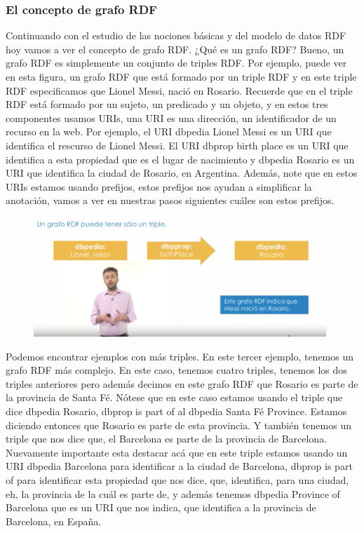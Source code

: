 \subsubsection{El concepto de grafo RDF}

Continuando con el estudio de las nociones básicas y del modelo de datos RDF hoy vamos a ver el concepto de grafo RDF. ¿Qué es un grafo RDF? Bueno, un grafo RDF es simplemente un conjunto de triples RDF. Por ejemplo, puede ver en esta figura, un grafo RDF que está formado por un triple RDF y en este triple RDF especificamos que Lionel Messi, nació en Rosario. Recuerde que en el triple RDF está formado por un sujeto, un predicado y un objeto, y en estos tres componentes usamos URIs, una URI es una dirección, un identificador de un recurso en la web. Por ejemplo, el URI dbpedia Lionel Messi es un URI que identifica el rescurso de Lionel Messi. El URI dbprop birth place es un URI que identifica a esta propiedad que es el lugar de nacimiento y dbpedia Rosario es un URI que identifica la ciudad de Rosario, en Argentina. Además, note que en estos URIs estamos usando prefijos, estos prefijos nos ayudan a simplificar la anotación, vamos a ver en nuestras pasos siguientes cuáles son estos prefijos. 

\begin{figure}[H]
	\centering
	\includegraphics[height=4.5cm]{imagenes/capitulo3/16} 
	\caption{}
	\label{}
\end{figure}

Podemos encontrar ejemplos con más triples. En este tercer ejemplo, tenemos un grafo RDF más complejo. En este caso, tenemos cuatro triples, tenemos los dos triples anteriores pero además decimos en este grafo RDF que Rosario es parte de la provincia de Santa Fé. Nótese que en este caso estamos usando el triple que dice dbpedia Rosario, dbprop is part of al dbpedia Santa Fé Province. Estamos diciendo entonces que Rosario es parte de esta provincia. Y también tenemos un triple que nos dice que, el Barcelona es parte de la provincia de Barcelona. Nuevamente importante esta destacar acá que en este triple estamos usando un URI dbpedia Barcelona para identificar a la ciudad de Barcelona, dbprop is part of para identificar esta propiedad que nos dice, que, identifica, para una ciudad, eh, la provincia de la cuál es parte de, y además tenemos dbpedia Province of Barcelona que es un URI que nos indica, que identifica a la provincia de Barcelona, en España.

